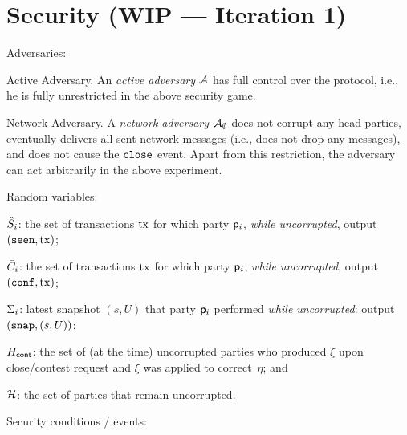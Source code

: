 \section{Security (WIP --- Iteration 1)}\label{sec:security}

\noindent Adversaries:

\begin{mdescription}
\item[Active Adversary.] An \emph{active adversary} $\mathcal{A}$ has full control
  over the protocol, i.e., he is fully unrestricted in the above security game.

 \item[Network Adversary.] A \emph{network adversary} $\mathcal{A}_\emptyset$ does not corrupt
   any head parties, eventually delivers all sent network messages
   (i.e., does not drop any messages), and does not cause the $\mathtt{close}$ event.
   Apart from this restriction, the adversary can act arbitrarily in the above experiment.
\end{mdescription}

\noindent Random variables:

\begin{mitemize}
\item $\hat{S}_i$: the set of transactions $\mathrm{tx}$ for which party $\mathsf p_i$,
  \emph{while uncorrupted}, output $(\mathtt{seen},\mathrm{tx})$;

\item $\bar{C}_i$: the set of transactions $\mathrm{tx}$ for which party $\mathsf p_i$,
  \emph{while uncorrupted}, output $(\mathtt{conf},\mathrm{tx})$;
    
\item $\bar{\Sigma}_i$: latest snapshot $(s,U)$ that party
  $\mathsf p_i$ performed \emph{while uncorrupted}: output $(\mathtt{snap},(s,U))$;

\item $H_{\mathsf{cont}}$: the set of (at the time) uncorrupted parties who produced
  $\xi$ upon close/contest request and $\xi$ was applied to
  correct~$\eta$; and

\item $\mathcal H$: the set of parties that remain uncorrupted.
\end{mitemize}


\noindent Security conditions / events:

